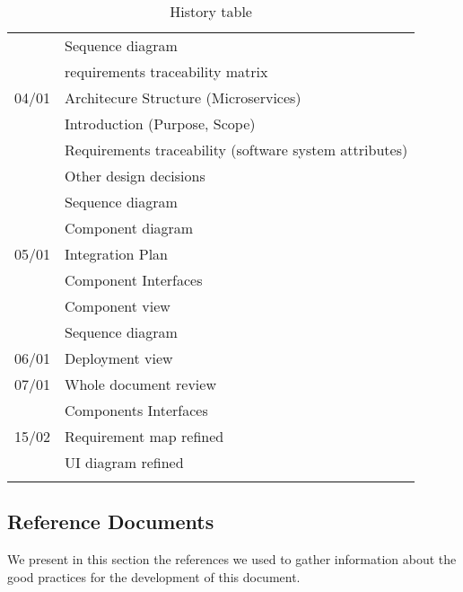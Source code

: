 \begin{center}
\begin{longtable}{ll}
         & Sequence diagram \\
         & requirements traceability matrix \\
        \hline
        04/01 & Architecure Structure (Microservices) \\
         & Introduction (Purpose, Scope) \\
         & Requirements traceability (software system attributes) \\
         & Other design decisions \\
         & Sequence diagram \\
         & Component diagram \\
        \hline
        05/01 & Integration Plan \\
         & Component Interfaces \\
         & Component view \\
         & Sequence diagram \\
        \hline
        06/01 & Deployment view \\
        \hline
        07/01 & Whole document review \\
         & Components Interfaces \\
        \hline
        \hline
        \hline
        15/02 & Requirement map refined \\
         & UI diagram refined \\
        \hline
        
        \rowcolor{white}\caption{\label{tab:history}History table}
        
    \end{longtable}
\end{center}

\subsection{Reference Documents}
\label{sec:ref_docs}
We present in this section the references we used to gather information about the good practices for the development of this document.
\begingroup
\renewcommand{\section}[2]{}%
\nocite{*}


\endgroup

